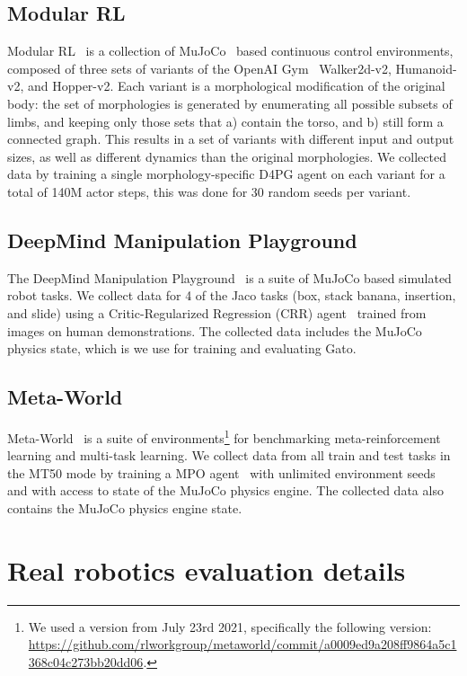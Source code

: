 \documentclass[10pt]{article} \usepackage[accepted]{tmlr}
\newcommand{\model}{{Gato}}
\begin{document}
\vskip 0.4cm
\subsection{Modular RL}
\vskip 0.2cm
Modular RL~\citep{huang2020one} is a collection of MuJoCo~\citep{todorov2012mujoco} based continuous control environments, composed of three sets of variants of the OpenAI Gym~\citep{brockman2016openai} Walker2d-v2, Humanoid-v2, and Hopper-v2.
Each variant is a morphological modification of the original body: the set of morphologies is generated by enumerating all possible subsets of limbs, and
keeping only those sets that a) contain the torso, and b) still form a connected graph.
This results in a set of variants with different input and output sizes, as well as different dynamics than the original morphologies.
We collected data by training a single morphology-specific D4PG agent on each variant for a total of 140M actor steps, this was done for 30 random seeds per variant.
\vskip 0.4cm
\subsection{DeepMind Manipulation Playground}
\vskip 0.2cm
The DeepMind Manipulation Playground~\citep{zolna2021task} is a suite of MuJoCo based simulated robot tasks.
We collect data for 4 of the Jaco tasks (box, stack banana, insertion, and slide) using a
Critic-Regularized Regression (CRR) agent~\citep{wang2020critic} trained from images on human demonstrations.
The collected data includes the MuJoCo physics state, which is we use for training and evaluating \model{}.
\vskip 0.4cm
\subsection{Meta-World}
\vskip 0.2cm
Meta-World~\citep{yu2020meta} is a suite of environments\footnote{We used a version from July 23rd 2021, specifically the following version: \url{https://github.com/rlworkgroup/metaworld/commit/a0009ed9a208ff9864a5c1368c04c273bb20dd06}.} for benchmarking meta-reinforcement learning and multi-task learning.
We collect data from all train and test tasks in the MT50 mode by training a MPO agent~\citep{abdolmaleki2018maximum} with
unlimited environment seeds and with access to state of the MuJoCo physics engine. The collected data also contains the MuJoCo physics engine state.

\section{Real robotics evaluation details}
\end{document}
